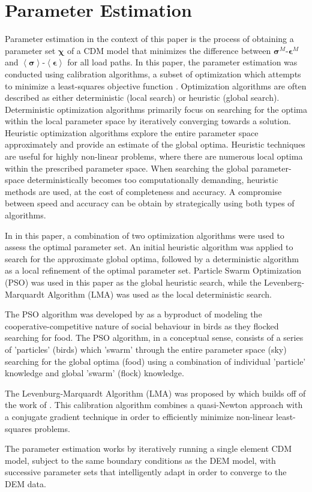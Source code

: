 \section{Parameter Estimation}
Parameter estimation in the context of this paper is the process of obtaining a parameter set $\boldsymbol{\chi}$ of a CDM model that minimizes the difference between $\boldsymbol{\sigma}^M$-$\boldsymbol{\epsilon}^M$ and $\left<\boldsymbol{\sigma}\right>$-$\left<\boldsymbol{\epsilon}\right>$ for all load paths. In this paper, the parameter estimation was conducted using calibration algorithms, a subset of optimization which attempts to minimize a least-squares objective function \cite{matott_ostrich:_2008}. Optimization algorithms are often described as either deterministic (local search) or heuristic (global search). Deterministic optimization algorithms primarily focus on searching for the optima within the local parameter space by iteratively converging towards a solution. Heuristic optimization algorithms explore the entire parameter space approximately and provide an estimate of the global optima. Heuristic techniques are useful for highly non-linear problems, where there are numerous local optima within the prescribed parameter space. When searching the global parameter-space deterministically becomes too computationally demanding, heuristic methods are used, at the cost of completeness and accuracy. A compromise between speed and accuracy can be obtain by strategically using both types of algorithms.

In in this paper, a combination of two optimization algorithms were used  to assess the optimal parameter set. An initial heuristic algorithm was applied to search for the approximate global optima, followed by a deterministic algorithm as a local refinement of the optimal parameter set. Particle Swarm Optimization (PSO) was used in this paper as the global heuristic search, while the Levenberg-Marquardt Algorithm (LMA) was used as the local deterministic search. 

The PSO algorithm was developed by  as a byproduct of modeling the cooperative-competitive nature of social behaviour in birds as they flocked searching for food. The PSO algorithm, in a conceptual sense, consists of a series of 'particles' (birds) which 'swarm' through the entire parameter space (sky) searching for the global optima (food) using a combination of individual 'particle' knowledge and global 'swarm' (flock) knowledge.

The Levenburg-Marquardt Algorithm (LMA) was proposed by \citet{marquardt_algorithm_1963} which builds off of the work of \citet{levenberg_method_1944}. This calibration algorithm combines a quasi-Newton approach with a conjugate gradient technique in order to efficiently minimize non-linear least-squares problems. 

The parameter estimation works by iteratively running a single element CDM model, subject to the same boundary conditions as the DEM model, with successive parameter sets that intelligently adapt in order to converge to the DEM data. 



